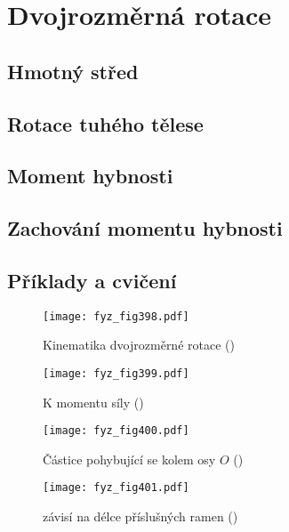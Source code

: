 {
\chapter{Dvojrozměrná rotace}\label{fyz:IchapXVIII}
\minitoc
\section{Hmotný střed}\label{fyz:IchapXVIIIsecI}
\section{Rotace tuhého tělese}\label{fyz:IchapXVIIIsecII}
\section{Moment hybnosti}\label{fyz:IchapXVIIIsecIII}
\section{Zachování momentu hybnosti}\label{fyz:IchapXVIIIsecIV}
\section{Příklady a cvičení}\label{fyz:IchapXVIIIsecVI}

  \begin{figure}[ht!] %
    \centering
    \texttt{[image: fyz\_fig398.pdf]}
    \caption{Kinematika dvojrozměrné rotace
             (\cite[s.~251]{Feynman01})}
    \label{fyz_fig398}
  \end{figure}

  \begin{figure}[ht!] %
    \centering
    \texttt{[image: fyz\_fig399.pdf]}
    \caption{K momentu síly
             (\cite[s.~253]{Feynman01})}
    \label{fyz_fig399}
  \end{figure}

  \begin{figure}[ht!] %
    \centering
    \texttt{[image: fyz\_fig400.pdf]}
    \caption{Částice pohybující se kolem osy \(O\)
             (\cite[s.~254]{Feynman01})}
    \label{fyz_fig400}
  \end{figure}

  \begin{figure}[ht!] %
    \centering
    \texttt{[image: fyz\_fig401.pdf]}
    \caption{ závisí na délce příslušných ramen
             (\cite[s.~10000]{Feynman01})}
    \label{fyz_fig401}
  \end{figure}
} %
\printbibliography[title={Seznam literatury}, heading=subbibliography]
